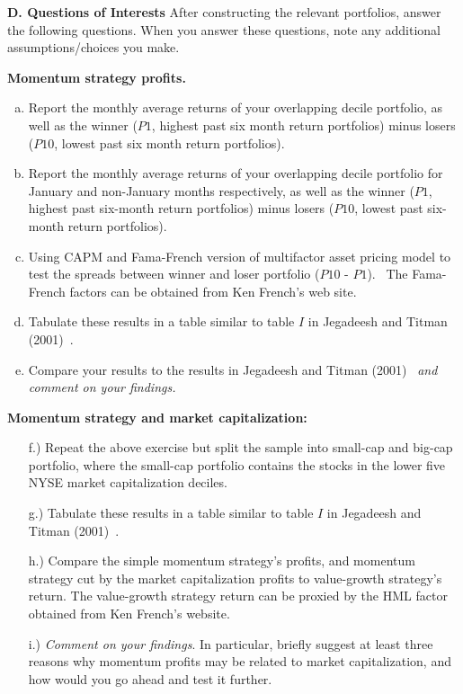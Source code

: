 \textbf{D. Questions of Interests}
After constructing the relevant portfolios, answer the following questions. When you answer these questions, note any additional assumptions/choices you make. \twomedskip


\textbf{Momentum strategy profits.}
	\begin{enumerate}[a.)]
	\item Report the monthly average returns of your overlapping decile portfolio, as well as the winner ($P1$, highest past six month return portfolios) minus losers ($P10$, lowest past six month return portfolios).
	\item Report the monthly average returns of your overlapping decile portfolio for January and non-January months respectively, as well as the winner ($P1$, highest past six-month return portfolios) minus losers ($P10$, lowest past six-month return portfolios).
	\item Using CAPM and Fama-French version of multifactor asset pricing model to test the spreads between winner and loser portfolio ($P10$ - $P1$). \ The Fama-French factors can be obtained from Ken French's web site.
	\item Tabulate these results in a table similar to table $I$ in Jegadeesh and Titman (2001)~\cite{JeTi}.
	\item Compare your results to the results in Jegadeesh and Titman (2001)~\cite{JeTi} \emph{and comment on your findings.} \twomedskip
	\end{enumerate}

\textbf{Momentum strategy and market capitalization:}
	\begin{enumerate}
	\item[f.)] Repeat the above exercise but split the sample into small-cap and big-cap portfolio, where the small-cap portfolio contains the stocks in the lower five NYSE market capitalization deciles.
	\item[g.)] Tabulate these results in a table similar to table $I$ in Jegadeesh
and Titman (2001)~\cite{JeTi}.
	\item[h.)] Compare the simple momentum strategy's profits, and momentum strategy cut by the market capitalization profits to value-growth strategy's return. The value-growth strategy return can be proxied by the HML factor obtained from Ken French's website.
	\item[i.)] \emph{Comment on your findings}. In particular, briefly suggest at least three reasons why momentum profits may be related to market capitalization, and how would you go ahead and test it further. \twomedskip
	\end{enumerate}


